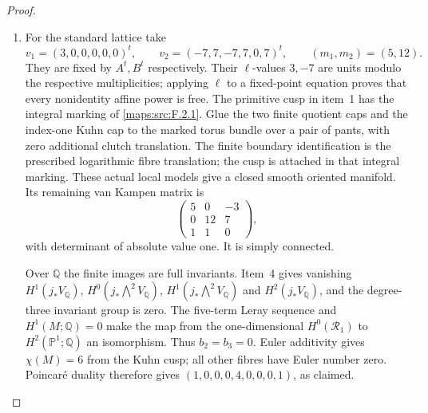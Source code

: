 \documentclass[11pt,a4paper]{article}
\theoremstyle{definition}
\begin{document}
\begin{proof}
\begin{enumerate}[label=\arabic*.]
\item For the standard lattice take
\[
 v_1=(3,0,0,0,0,0)^t,\qquad
 v_2=(-7,7,-7,7,0,7)^t,\qquad (m_1,m_2)=(5,12).
\]
They are fixed by $A^t,B^t$ respectively.
Their $\ell$-values $3,-7$ are units modulo the respective
multiplicities; applying $\ell$ to a fixed-point equation proves
that every nonidentity affine power is free.
The primitive cusp in item~1 has the integral marking of
\cref{maps:src:F.2.1}.  Glue the two finite quotient caps and
the index-one Kuhn cap to the marked torus bundle over a pair
of pants, with zero additional clutch translation.  The finite
boundary identification is the prescribed logarithmic fibre
translation; the cusp is attached in that integral marking.
These actual local models give a closed smooth oriented
manifold.  Its remaining van Kampen matrix is
\[
 \begin{pmatrix}5&0&-3\\0&12&7\\1&1&0\end{pmatrix},
\]
with determinant of absolute value one.  It is simply connected.

Over $\mathbb Q$ the finite images are full invariants.
Item~4 gives vanishing $H^1(j_*V_{\mathbb Q})$,
$H^0(j_*\bigwedge^2V_{\mathbb Q})$,
$H^1(j_*\bigwedge^2V_{\mathbb Q})$ and
$H^2(j_*V_{\mathbb Q})$, and the degree-three invariant group
is zero.  The five-term Leray sequence and $H^1(M;\mathbb Q)=0$
make the map from the one-dimensional $H^0(\mathcal R_1)$ to
$H^2(\mathbb P^1;\mathbb Q)$ an isomorphism.
Thus $b_2=b_3=0$.
Euler additivity gives $\chi(M)=6$ from the Kuhn cusp;
all other fibres have Euler number zero.
Poincar\'e duality therefore gives
$(1,0,0,0,4,0,0,0,1)$, as claimed.
\end{enumerate}
\end{proof}
\end{document}
